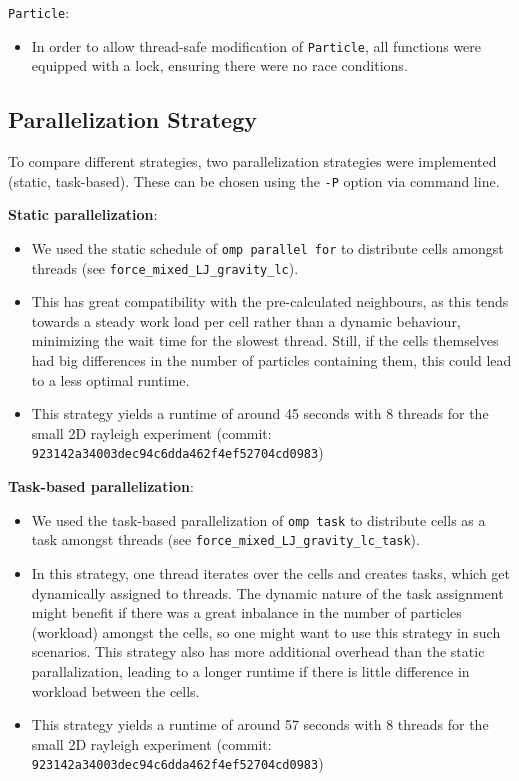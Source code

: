 \documentclass{article}
\begin{document}
\texttt{Particle}:
\begin{itemize}
    \item{In order to allow thread-safe modification of \texttt{Particle}, all functions were equipped with a lock, ensuring there were no race conditions.}
\end{itemize}

\subsection{Parallelization Strategy}
To compare different strategies, two parallelization strategies were implemented (static, task-based).
These can be chosen using the \texttt{-P} option via command line.
\bigskip

\textbf{Static parallelization}:
\begin{itemize}
    \item{We used the static schedule of \texttt{omp parallel for} to distribute cells amongst threads (see \texttt{force\_mixed\_LJ\_gravity\_lc}).}
    \item{This has great compatibility with the pre-calculated neighbours, as this tends towards a steady work load per cell rather than a dynamic behaviour, minimizing the wait time for the slowest thread. Still, if the cells themselves had big differences in the number of particles containing them, this could lead to a less optimal runtime.}
    \item{This strategy yields a runtime of around 45 seconds with 8 threads for the small 2D rayleigh experiment (commit: \texttt{923142a34003dec94c6dda462f4ef52704cd0983})}
\end{itemize}

\textbf{Task-based parallelization}:
\begin{itemize}
    \item{We used the task-based parallelization of \texttt{omp task} to distribute cells as a task amongst threads (see \texttt{force\_mixed\_LJ\_gravity\_lc\_task}).}
    \item{In this strategy, one thread iterates over the cells and creates tasks, which get dynamically assigned to threads. The dynamic nature of the task assignment might benefit if there was a great inbalance in the number of particles (workload) amongst the cells, so one might want to use this strategy in such scenarios. This strategy also has more additional overhead than the static parallalization, leading to a longer runtime if there is little difference in workload between the cells.}
    \item{This strategy yields a runtime of around 57 seconds with 8 threads for the small 2D rayleigh experiment (commit: \texttt{923142a34003dec94c6dda462f4ef52704cd0983})}
\end{itemize}
\end{document}
